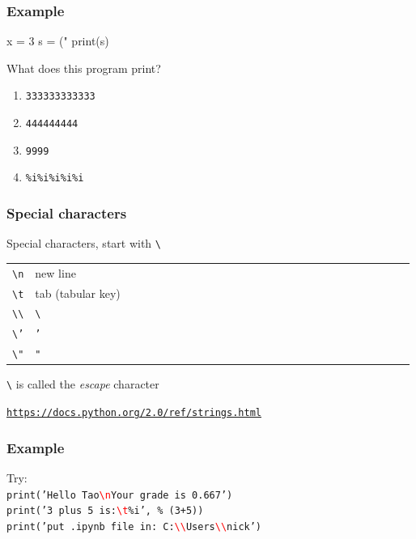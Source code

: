 \documentclass[11pt]{beamer}
\begin{document}
\begin{frame}[fragile]
  \frametitle{Example}
  \Enlarge

  \begin{semiverbatim}
x = 3
s = ("%
print(s)
  \end{semiverbatim}

  What does this program print?
  \begin{enumerate}[label=\Alph*]
  \item  \texttt{333333333333}
  \item  \texttt{444444444}
  \item  \texttt{9999}
  \item  \texttt{\%i\%i\%i\%i\%i}
  \end{enumerate}
\end{frame}


\begin{frame}
  \frametitle{Special characters}
  \Enlarge

  \begin{itemize}
  \myitem  Special characters, start with \texttt{\textbackslash}
    \begin{tabular}{*{27}{l}}
      \texttt{\textbackslash n} & new line \\
      \texttt{\textbackslash t} & tab (tabular key)\\
      \texttt{\textbackslash \textbackslash} & \texttt{\textbackslash} \\
      \texttt{\textbackslash '} & \texttt{'} \\
      \texttt{\textbackslash "} & \texttt{"} \\
   \end{tabular} 
  \myitem \texttt{\textbackslash} is called the \emph{escape} character
  \begin{itemize}
  	\mysubitem  \textcolor{blue}{\small \texttt{\url{https://docs.python.org/2.0/ref/strings.html}}} 
  \end{itemize}
  \end{itemize}
  
\end{frame}


\begin{frame}[fragile]
  \frametitle{Example}
  \Enlarge

  \hspace{10mm}Try: \\
  \hspace{12mm}\texttt{\small print('Hello Tao\texttt{\textcolor{red}{\textbackslash n}}Your grade is 0.667') \\
  \hspace{12mm}print('3 plus 5 is:\texttt{\textcolor{red}{\textbackslash t}}\%i', \% (3+5)) \\
  \hspace{12mm}print('put .ipynb file in: C:\texttt{\textcolor{red}{\textbackslash \textbackslash}}Users\texttt{\textcolor{red}{\textbackslash \textbackslash}}nick')
  }
\end{frame}
\end{document}
